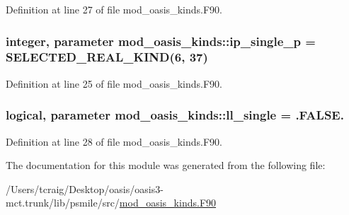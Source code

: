 Definition at line 27 of file mod\+\_\+oasis\+\_\+kinds.\+F90.

\hypertarget{classmod__oasis__kinds_a298ab0c96a80ba12ba8969e6bcd186ed}{
\subsubsection[{ip\+\_\+single\+\_\+p}]{\setlength{\rightskip}{0pt plus 5cm}integer, parameter mod\+\_\+oasis\+\_\+kinds\+::ip\+\_\+single\+\_\+p = S\+E\+L\+E\+C\+T\+E\+D\+\_\+\+R\+E\+A\+L\+\_\+\+K\+I\+N\+D(6, 37)}}\label{classmod__oasis__kinds_a298ab0c96a80ba12ba8969e6bcd186ed}


Definition at line 25 of file mod\+\_\+oasis\+\_\+kinds.\+F90.

\hypertarget{classmod__oasis__kinds_ae462c851305d5fe6ef6178c9dcac4468}{
\subsubsection[{ll\+\_\+single}]{\setlength{\rightskip}{0pt plus 5cm}logical, parameter mod\+\_\+oasis\+\_\+kinds\+::ll\+\_\+single = .F\+A\+L\+S\+E.}}\label{classmod__oasis__kinds_ae462c851305d5fe6ef6178c9dcac4468}


Definition at line 28 of file mod\+\_\+oasis\+\_\+kinds.\+F90.



The documentation for this module was generated from the following file\+:\begin{DoxyCompactItemize}
\item 
/\+Users/tcraig/\+Desktop/oasis/oasis3-\/mct.\+trunk/lib/psmile/src/\hyperlink{mod__oasis__kinds_8_f90}{mod\+\_\+oasis\+\_\+kinds.\+F90}\end{DoxyCompactItemize}
